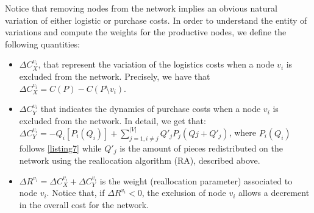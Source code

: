 Notice that removing nodes from the network implies an obvious natural variation of either logistic or purchase costs. In order to understand the entity of variations and compute the weights for the productive nodes, we define the following quantities:
\begin{itemize}
    \item $\Delta C^{v_i}_X$, that represent the variation of the logistics costs when a node $v_i$ is excluded from the network. Precisely, we have that $\Delta C^{v_i}_X = C(P) - C(P\setminus v_i)$.
    \item $\Delta C^{v_i}_Y$ that indicates the dynamics of purchase costs when a node $v_i$ is excluded from the network. In detail, we get that: $\Delta C^{v_i}_Y = -Q_i \left[P_i (Q_i)\right] + \sum^{|V|}_{j=1,i \neq j} Q\prime _j P_j (Qj + Q\prime _j)$, where $P_i (Q_i)$ follows \ref{listing7} while $Q\prime _j$ is the amount of pieces redistributed on the network using the reallocation algorithm (RA), described above.
    \item $\Delta R^{v_i} = \Delta C_X^{v_i} + \Delta C_Y^{v_i}$ is the weight (reallocation parameter) associated to node $v_i$. Notice that, if $\Delta R^{v_i} < 0$, the exclusion of node $v_i$ allows a decrement in the overall cost for the network.
\end{itemize}

